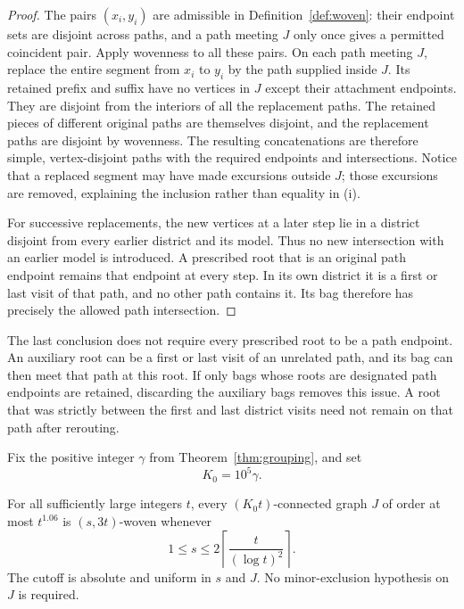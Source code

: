 \begin{proof}
The pairs $(x_i,y_i)$ are admissible in Definition~\ref{def:woven}:
their endpoint sets are disjoint across paths, and a path meeting $J$
only once gives a permitted coincident pair.  Apply wovenness to all
these pairs.  On each path meeting $J$, replace the entire segment from
$x_i$ to $y_i$ by the path supplied inside $J$.  Its retained prefix and
suffix have no vertices in $J$ except their attachment endpoints.
They are disjoint from the interiors of all the replacement paths.
The retained pieces of different original paths are themselves
disjoint, and the replacement paths are disjoint by wovenness.
The resulting concatenations are therefore simple, vertex-disjoint
paths with the required endpoints and intersections.  Notice that a
replaced segment may have made excursions outside $J$; those excursions
are removed, explaining the inclusion rather than equality in (i).

For successive replacements, the new vertices at a later step lie in
a district disjoint from every earlier district and its model.  Thus
no new intersection with an earlier model is introduced.  A prescribed
root that is an original path endpoint remains that endpoint at every
step.  In its own district it is a first or last visit of that path,
and no other path contains it.  Its bag therefore has precisely the
allowed path intersection.
\end{proof}

\begin{remark}\label{routing:padding-roots}
The last conclusion does not require every prescribed root to be a
path endpoint.  An auxiliary root can be a first or last visit of an
unrelated path, and its bag can then meet that path at this root.
If only bags whose roots are designated path endpoints are retained,
discarding the auxiliary bags removes this issue.  A root that was
strictly between the first and last district visits need not remain
on that path after rerouting.
\end{remark}

Fix the positive integer $\gamma$ from Theorem~\ref{thm:grouping}, and set
\begin{equation}\label{routing:K0}
 K_0=10^5\gamma.
\end{equation}

\begin{lemma}\label{lem:small-woven}
For all sufficiently large integers $t$, every $(K_0t)$-connected graph
$J$ of order at most $t^{1.06}$ is $(s,3t)$-woven whenever
\[
 1\le s\le 2\left\lceil\frac{t}{(\log t)^2}\right\rceil.
\]
The cutoff is absolute and uniform in $s$ and $J$.  No minor-exclusion
hypothesis on $J$ is required.
\end{lemma}

